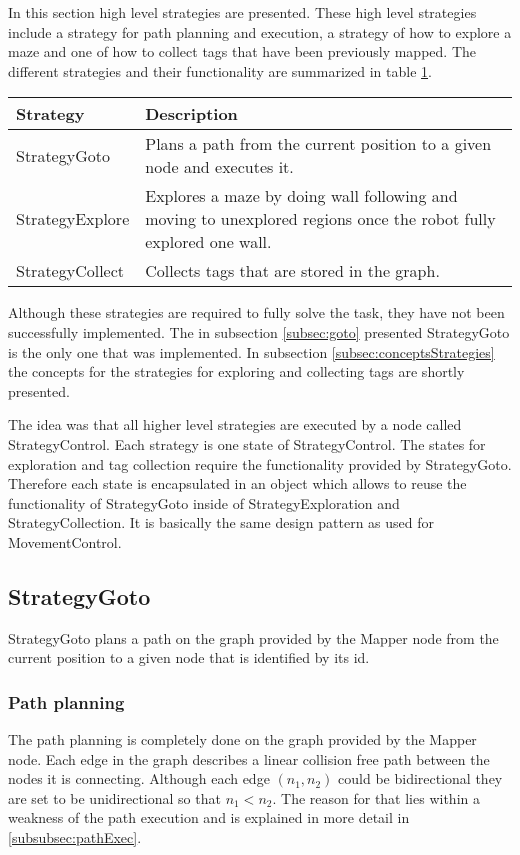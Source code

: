 In this section high level strategies are presented. These high level strategies include a strategy for path planning and execution, a strategy of
how to explore a maze and one of how to collect tags that have been previously mapped. The different strategies and their functionality are summarized in table \ref{table:strategies}.

\begin{table}[h]
\label{table:strategies}
\center
  \begin{tabular}{l|p{10cm}}
    \textbf{Strategy} & \textbf{Description} \\ \hline
    StrategyGoto & Plans a path from the current position to a given node and executes it.  \\ \hline
    StrategyExplore & Explores a maze by doing wall following and moving to unexplored regions once the robot fully explored one wall. \\ \hline
    StrategyCollect & Collects tags that are stored in the graph. \\
    \hline
  \end{tabular}
\end{table}

Although these strategies are required to fully solve the task, they have not been successfully implemented. The in subsection \ref{subsec:goto} presented StrategyGoto is the only one that was implemented. In subsection \ref{subsec:conceptsStrategies} the concepts for the strategies for exploring and collecting tags are shortly presented.

The idea was that all higher level strategies are executed by a node called StrategyControl. Each strategy is one state of StrategyControl. 
The states for exploration and tag collection require the functionality provided by StrategyGoto. Therefore each state is encapsulated in an object which allows to reuse the functionality of StrategyGoto inside of StrategyExploration and StrategyCollection. It is basically the same design pattern as used for MovementControl.

\subsection{StrategyGoto}
StrategyGoto plans a path on the graph provided by the Mapper node from the current position to a given node that is identified by its id.
\subsubsection{Path planning}
\label{pathplanning}
The path planning is completely done on the graph provided by the Mapper node. Each edge in the graph describes a linear collision free path between the nodes it is connecting. Although each edge $(n_1,n_2)$ could be bidirectional they are set to be unidirectional so that $n_1 < n_2$. The reason for that lies within a weakness of the path execution and is explained in more detail in \ref{subsubsec:pathExec}. 

